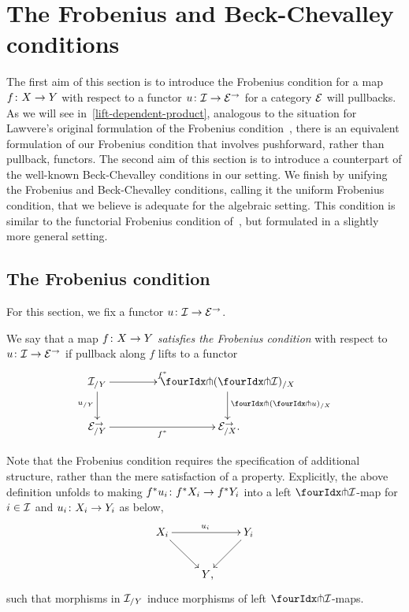 \documentclass[reqno,10pt,a4paper,oneside,draft]{amsart}
\begin{document}
\section{The Frobenius and Beck-Chevalley conditions}
\label{sec:frobc}

The first aim of this section is to introduce the Frobenius condition for a map $f \co X \to Y$ with respect to a functor $u \co \cal{I} \to \catE^\to$ for a category $\cal{E}$ will pullbacks.
As we will see in~\cref{lift-dependent-product}, analogous to the situation for Lawvere's original formulation of the Frobenius condition~\cite{lawvere-equality}, there is an equivalent formulation of our Frobenius condition that involves pushforward, rather than pullback, functors.
The second aim of this section is to introduce a counterpart of the well-known Beck-Chevalley conditions in our setting.
We finish by unifying the Frobenius and Beck-Chevalley conditions, calling it the uniform Frobenius condition, that we believe is adequate for the algebraic setting.
This condition is similar to the functorial Frobenius condition of~\cite{garner:topological-simplicial}, but formulated in a slightly more general setting.

\subsection*{The Frobenius condition}

For this section, we fix a functor $u \co \cal{I} \to \catE^\to$.

\begin{definition} \label{thm:frobenius-def}
We say that a map $f \co X \to Y$ \emph{satisfies the Frobenius condition} with respect to $u \co \cal{I} \to \cal{E}^\to$ if pullback along $f$ lifts to a functor
\[
\xymatrix@C=1.5cm{
  \cal{I}_{/Y}
  \ar[r]^{f^*}
  \ar[d]_{u_{/Y}}
&
  \liftl{(\liftr{\cal{I}})}_{/X}
  \ar[d]^{\liftl{(\liftr{u})}_{/X}}
\\
  \catE_{/Y}^\to \ar[r]_{f^*}
&
  \catE_{/X}^\to
\rlap{.}}
\]
\end{definition}

\begin{remark} \label{frobenius-no-coherence}
Note that the Frobenius condition requires the specification of additional structure, rather than the mere satisfaction of a property.
Explicitly, the above definition unfolds to making $f^* u_i \co f^* X_i \to f^* Y_i$ into a left $\liftr{\cal{I}}$-map for $i \in \cal{I}$ and $u_i \co X_i \to Y_i$ as below,
\[
\xymatrix{
  X_i
  \ar[dr]
  \ar[rr]^{u_i}
&&
  Y_i
  \ar[dl]
\\&
   Y
\rlap{,}}
\]
such that morphisms in $\cal{I}_{/Y}$ induce morphisms of left $\liftr{\cal{I}}$-maps.
\end{remark}
\end{document}
